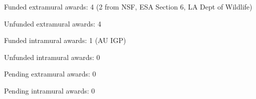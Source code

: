 \begin{veryTightItemize}
    \item Funded extramural awards: 4 (2 from NSF, ESA Section 6, LA Dept of Wildlife)
    \item Unfunded extramural awards: 4
    \item Funded intramural awards: 1 (AU IGP)
    \item Unfunded intramural awards: 0
    \item Pending extramural awards: 0
    \item Pending intramural awards: 0
\end{veryTightItemize}
